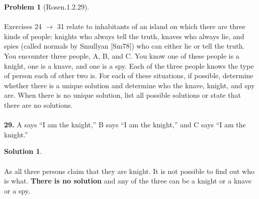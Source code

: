 \documentclass{article}
\theoremstyle{definition}
\newtheorem*{problem}{Problem}
\newtheorem*{solution}{Solution}
\begin{document}
\begin{problem}[Rosen.1.2.29]\ \\
\ \\
Exercises 24 $\rightarrow$ 31 relate to inhabitants of an island on which
there are three kinds of people: knights who always tell the
truth, knaves who always lie, and spies (called normals by
Smullyan [Sm78]) who can either lie or tell the truth. You
encounter three people, A, B, and C. You know one of these
people is a knight, one is a knave, and one is a spy. Each of the
three people knows the type of person each of other two is. For
each of these situations, if possible, determine whether there
is a unique solution and determine who the knave, knight, and
spy are. When there is no unique solution, list all possible
solutions or state that there are no solutions.\ \\
\ \\
\textbf{29.} A says “I am the knight,” B says “I am the knight,” and
C says “I am the knight.”
\begin{compactenum}
\renewcommand{\theenumi}{\alph{enumi}}

\end{compactenum}
\end{problem}

\begin{solution}\ \\
\ \\
As all three persons claim that they are knight. It is not possible to find out who is what. \textbf{There is no solution} and any of the three can be a knight or a knave or a spy.

\begin{compactenum}
\renewcommand{\theenumi}{\alph{enumi}}


\end{compactenum}
\end{solution}
\end{document}

